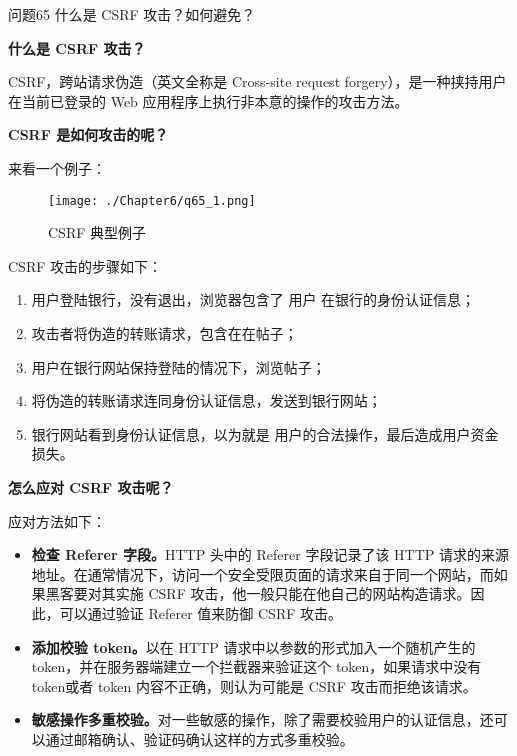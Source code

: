 \documentclass[cn,11pt,color=blue,lang=cn]{elegantbook}
\begin{document}
\begin{custom}{问题65}
什么是 CSRF 攻击？如何避免？
\end{custom}
\begin{solution}
\begin{note} \textbf{什么是 CSRF 攻击？} \end{note}
CSRF，跨站请求伪造（英文全称是 Cross-site request forgery），是一种挟持用户在当前已登录的 Web 应用程序上执行非本意的操作的攻击方法。

\begin{note} \textbf{CSRF 是如何攻击的呢？} \end{note}
来看一个例子：

\begin{figure}[!h]
\centering
\texttt{[image: ./Chapter6/q65\_1.png]}
\caption{CSRF 典型例子}
\label{fig65_1}
\end{figure}

CSRF 攻击的步骤如下：
\begin{enumerate}
	\item 用户登陆银行，没有退出，浏览器包含了 用户 在银行的身份认证信息；
	\item 攻击者将伪造的转账请求，包含在在帖子；
	\item 用户在银行网站保持登陆的情况下，浏览帖子；
	\item 将伪造的转账请求连同身份认证信息，发送到银行网站；
	\item 银行网站看到身份认证信息，以为就是 用户的合法操作，最后造成用户资金损失。
\end{enumerate}
\begin{note} \textbf{怎么应对 CSRF 攻击呢？} \end{note}
应对方法如下：
\begin{itemize}
	\item \textbf{检查 Referer 字段。}HTTP 头中的 Referer 字段记录了该 HTTP 请求的来源地址。在通常情况下，访问一个安全受限页面的请求来自于同一个网站，而如果黑客要对其实施 CSRF 攻击，他一般只能在他自己的网站构造请求。因此，可以通过验证 Referer 值来防御 CSRF 攻击。
	\item \textbf{添加校验 token。}以在 HTTP 请求中以参数的形式加入一个随机产生的 token，并在服务器端建立一个拦截器来验证这个 token，如果请求中没有 token或者 token 内容不正确，则认为可能是 CSRF 攻击而拒绝该请求。
	\item \textbf{敏感操作多重校验。}对一些敏感的操作，除了需要校验用户的认证信息，还可以通过邮箱确认、验证码确认这样的方式多重校验。
\end{itemize}

\end{solution}
\end{document}
